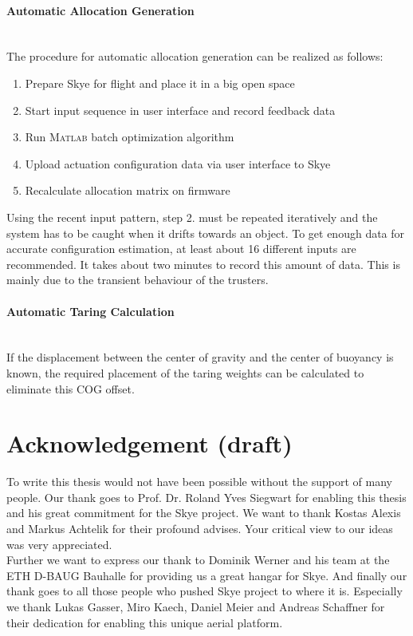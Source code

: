 \paragraph{Automatic Allocation Generation}~\\
The procedure for automatic allocation generation can be realized as follows:
\begin{enumerate}
\item Prepare Skye for flight and place it in a big open space
\item Start input sequence in user interface and record feedback data
\item Run \textsc{Matlab} batch optimization algorithm
\item Upload actuation configuration data via user interface to Skye
\item Recalculate allocation matrix on firmware
\end{enumerate}
Using the recent input pattern, step 2. must be repeated iteratively and the system has to be caught when it drifts towards an object.
To get enough data for accurate configuration estimation, at least about 16 different inputs are recommended.
It takes about two minutes to record this amount of data.
This is mainly due to the transient behaviour of the trusters.
 
\paragraph{Automatic Taring Calculation}~\\
If the displacement between the center of gravity and the center of buoyancy is known, the required placement of the taring weights can be calculated to eliminate this COG offset.


\section{Acknowledgement (draft)}
To write this thesis would not have been possible without the support of many people.
Our thank goes to Prof. Dr. Roland Yves Siegwart for enabling this thesis and his great commitment for the Skye project.
We want to thank Kostas Alexis and Markus Achtelik for their profound advises.
Your critical view to our ideas was very appreciated. \\
Further we want to express our thank to Dominik Werner and his team at the ETH D-BAUG Bauhalle for providing us a great hangar for Skye.
And finally our thank goes to all those people who pushed Skye project to where it is.
Especially we thank Lukas Gasser, Miro Kaech, Daniel Meier and Andreas Schaffner for their dedication for enabling this unique aerial platform. 